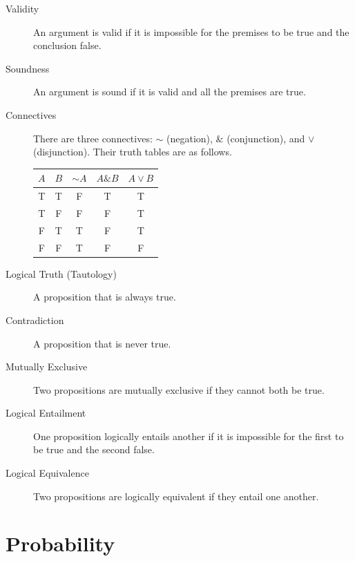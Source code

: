 \documentclass[justified]{tufte-book}
\renewcommand{\neg}{\mathbin{\sim}}
\renewcommand{\wedge}{\mathbin{\&}}
\theoremstyle{definition}
\theoremstyle{definition}
\theoremstyle{definition}
\theoremstyle{definition}
\theoremstyle{remark}
\begin{document}
\begin{description}
\item[Validity]
An argument is valid if it is impossible for the premises to be true and the conclusion false.
\item[Soundness]
An argument is sound if it is valid and all the premises are true.
\item[Connectives]
There are three connectives: \(\neg\) (negation), \(\wedge\) (conjunction), and \(\vee\) (disjunction). Their truth tables are as follows.

\begin{longtable}[]{@{}ccccc@{}}
\toprule
\(A\) & \(B\) & \(\neg A\) & \(A \wedge B\) & \(A \vee B\) \\
\midrule
\endhead
T & T & F & T & T \\
T & F & F & F & T \\
F & T & T & F & T \\
F & F & T & F & F \\
\bottomrule
\end{longtable}
\item[Logical Truth (Tautology)]
A proposition that is always true.
\item[Contradiction]
A proposition that is never true.
\item[Mutually Exclusive]
Two propositions are mutually exclusive if they cannot both be true.
\item[Logical Entailment]
One proposition logically entails another if it is impossible for the first to be true and the second false.
\item[Logical Equivalence]
Two propositions are logically equivalent if they entail one another.
\end{description}

\hypertarget{probability}{%
\section*{Probability}\label{probability}}
\end{document}

